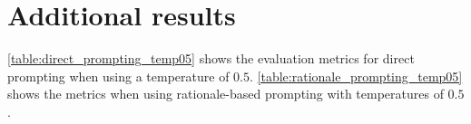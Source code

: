 \section{Additional results}
\label{app:additional_results}


\autoref{table:direct_prompting_temp05} shows the \SCE evaluation metrics for direct prompting when using a temperature of $0.5$. 
\autoref{table:rationale_prompting_temp05} shows the metrics when using rationale-based prompting with temperatures of  $0.5$.




